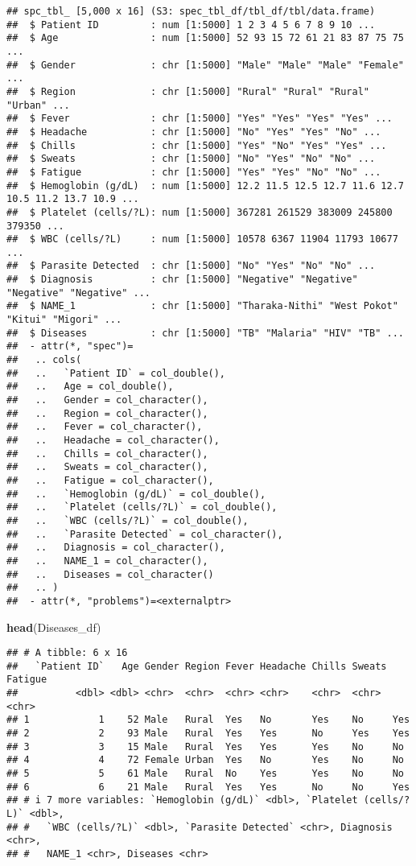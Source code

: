 \documentclass[
]{article}
\newenvironment{Shaded}{\begin{snugshade}}{\end{snugshade}}
\newcommand{\FunctionTok}[1]{\textcolor[rgb]{0.13,0.29,0.53}{\textbf{#1}}}
\newcommand{\NormalTok}[1]{#1}
\begin{document}
\begin{verbatim}
## spc_tbl_ [5,000 x 16] (S3: spec_tbl_df/tbl_df/tbl/data.frame)
##  $ Patient ID         : num [1:5000] 1 2 3 4 5 6 7 8 9 10 ...
##  $ Age                : num [1:5000] 52 93 15 72 61 21 83 87 75 75 ...
##  $ Gender             : chr [1:5000] "Male" "Male" "Male" "Female" ...
##  $ Region             : chr [1:5000] "Rural" "Rural" "Rural" "Urban" ...
##  $ Fever              : chr [1:5000] "Yes" "Yes" "Yes" "Yes" ...
##  $ Headache           : chr [1:5000] "No" "Yes" "Yes" "No" ...
##  $ Chills             : chr [1:5000] "Yes" "No" "Yes" "Yes" ...
##  $ Sweats             : chr [1:5000] "No" "Yes" "No" "No" ...
##  $ Fatigue            : chr [1:5000] "Yes" "Yes" "No" "No" ...
##  $ Hemoglobin (g/dL)  : num [1:5000] 12.2 11.5 12.5 12.7 11.6 12.7 10.5 11.2 13.7 10.9 ...
##  $ Platelet (cells/?L): num [1:5000] 367281 261529 383009 245800 379350 ...
##  $ WBC (cells/?L)     : num [1:5000] 10578 6367 11904 11793 10677 ...
##  $ Parasite Detected  : chr [1:5000] "No" "Yes" "No" "No" ...
##  $ Diagnosis          : chr [1:5000] "Negative" "Negative" "Negative" "Negative" ...
##  $ NAME_1             : chr [1:5000] "Tharaka-Nithi" "West Pokot" "Kitui" "Migori" ...
##  $ Diseases           : chr [1:5000] "TB" "Malaria" "HIV" "TB" ...
##  - attr(*, "spec")=
##   .. cols(
##   ..   `Patient ID` = col_double(),
##   ..   Age = col_double(),
##   ..   Gender = col_character(),
##   ..   Region = col_character(),
##   ..   Fever = col_character(),
##   ..   Headache = col_character(),
##   ..   Chills = col_character(),
##   ..   Sweats = col_character(),
##   ..   Fatigue = col_character(),
##   ..   `Hemoglobin (g/dL)` = col_double(),
##   ..   `Platelet (cells/?L)` = col_double(),
##   ..   `WBC (cells/?L)` = col_double(),
##   ..   `Parasite Detected` = col_character(),
##   ..   Diagnosis = col_character(),
##   ..   NAME_1 = col_character(),
##   ..   Diseases = col_character()
##   .. )
##  - attr(*, "problems")=<externalptr>
\end{verbatim}

\begin{Shaded}
\begin{Highlighting}[]
\FunctionTok{head}\NormalTok{(Diseases\_df)}
\end{Highlighting}
\end{Shaded}

\begin{verbatim}
## # A tibble: 6 x 16
##   `Patient ID`   Age Gender Region Fever Headache Chills Sweats Fatigue
##          <dbl> <dbl> <chr>  <chr>  <chr> <chr>    <chr>  <chr>  <chr>  
## 1            1    52 Male   Rural  Yes   No       Yes    No     Yes    
## 2            2    93 Male   Rural  Yes   Yes      No     Yes    Yes    
## 3            3    15 Male   Rural  Yes   Yes      Yes    No     No     
## 4            4    72 Female Urban  Yes   No       Yes    No     No     
## 5            5    61 Male   Rural  No    Yes      Yes    No     No     
## 6            6    21 Male   Rural  Yes   Yes      No     No     Yes    
## # i 7 more variables: `Hemoglobin (g/dL)` <dbl>, `Platelet (cells/?L)` <dbl>,
## #   `WBC (cells/?L)` <dbl>, `Parasite Detected` <chr>, Diagnosis <chr>,
## #   NAME_1 <chr>, Diseases <chr>
\end{verbatim}
\end{document}
